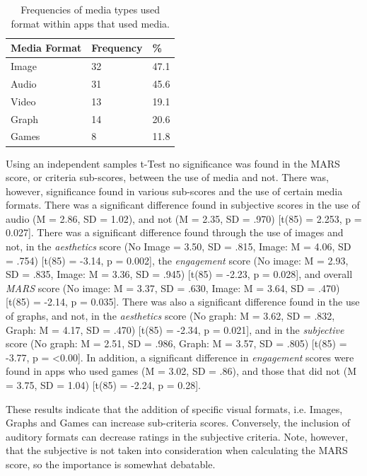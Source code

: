 \begin{table}[h]
\centering
\caption{Frequencies of media types used format within apps that used media.}
\label{tbl: mediaformat-frequencies}
\begin{tabular}{@{}lll@{}}
\toprule
Media Format & Frequency & \% \\ \midrule
Image & 32 & 47.1 \\
Audio & 31 & 45.6 \\
Video & 13 & 19.1 \\
Graph & 14 & 20.6 \\
Games & 8 & 11.8 \\ \bottomrule
\end{tabular}
\end{table}

Using an independent samples t-Test no significance was found in the MARS score, or criteria sub-scores, between the use of media and not. There was, however, significance found in various sub-scores and the use of certain media formats. There was a significant difference found in subjective scores in the use of audio (M = 2.86, SD = 1.02), and not (M = 2.35, SD = .970) [t(85) = 2.253, p = 0.027].
There was a significant difference found through the use of images and not, in the \textit{aesthetics} score (No Image = 3.50, SD = .815,  Image: M = 4.06, SD = .754) [t(85) = -3.14, p = 0.002], the \textit{engagement} score (No image: M = 2.93, SD = .835, Image: M = 3.36, SD = .945) [t(85) = -2.23, p = 0.028], and overall \textit{MARS} score (No image: M = 3.37, SD = .630, Image: M = 3.64, SD = .470) [t(85) = -2.14, p = 0.035].
There was also a significant difference found in the use of graphs, and not, in the \textit{aesthetics} score (No graph: M = 3.62, SD = .832, Graph: M = 4.17, SD = .470) [t(85) = -2.34, p = 0.021], and in the \textit{subjective} score (No graph: M = 2.51, SD = .986, Graph: M = 3.57, SD = .805) [t(85) = -3.77, p = \textless0.00].
In addition, a significant difference in \textit{engagement} scores were found in apps who used games (M =  3.02, SD = .86), and those that did not (M = 3.75, SD = 1.04) [t(85) = -2.24, p = 0.28].

These results indicate that the addition of specific visual formats, i.e. Images, Graphs and Games can increase sub-criteria scores. Conversely, the inclusion of auditory formats can decrease ratings in the subjective criteria. Note, however, that the subjective is not taken into consideration when calculating the MARS score, so the importance is somewhat debatable.

